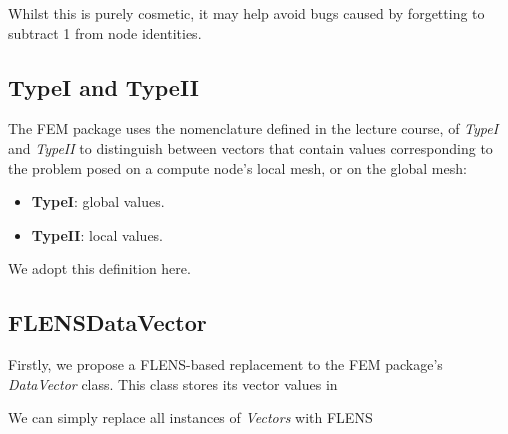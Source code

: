Whilst this is purely cosmetic, it may help avoid bugs caused by forgetting to subtract 1 from node identities. 

\subsection{TypeI and TypeII}

The FEM package uses the nomenclature defined in the lecture course, of \emph{TypeI} and \emph{TypeII} to distinguish between vectors that contain values corresponding to the problem posed on a compute node's local mesh, or on the global mesh:

\begin {itemize}
   \item \textbf{TypeI}: global values.
   \item \textbf{TypeII}: local values.
\end{itemize}

We adopt this definition here.

\subsection{FLENSDataVector}

Firstly, we propose a FLENS-based replacement to the FEM package's \emph{DataVector} class. This class stores its vector values in 



We can simply replace all instances of \emph{Vectors} with FLENS 